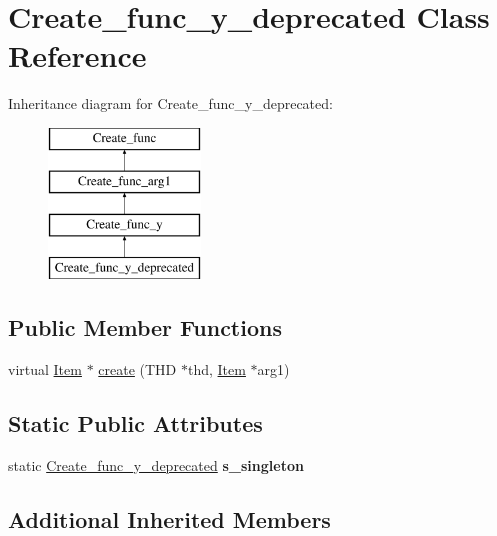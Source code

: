 \hypertarget{classCreate__func__y__deprecated}{}\section{Create\+\_\+func\+\_\+y\+\_\+deprecated Class Reference}
\label{classCreate__func__y__deprecated}
Inheritance diagram for Create\+\_\+func\+\_\+y\+\_\+deprecated\+:\begin{figure}[H]
\begin{center}
\leavevmode
\includegraphics[height=4.000000cm]{classCreate__func__y__deprecated}
\end{center}
\end{figure}
\subsection*{Public Member Functions}
\begin{DoxyCompactItemize}
\item 
virtual \mbox{\hyperlink{classItem}{Item}} $\ast$ \mbox{\hyperlink{classCreate__func__y__deprecated_a0321bced52d2aeb8efaec4648937fb43}{create}} (T\+HD $\ast$thd, \mbox{\hyperlink{classItem}{Item}} $\ast$arg1)
\end{DoxyCompactItemize}
\subsection*{Static Public Attributes}
\begin{DoxyCompactItemize}
\item 
\mbox{\label{classCreate__func__y__deprecated_a556e83d67d873dff41e9e42b386257ca}} 
static \mbox{\hyperlink{classCreate__func__y__deprecated}{Create\+\_\+func\+\_\+y\+\_\+deprecated}} {\bfseries s\+\_\+singleton}
\end{DoxyCompactItemize}
\subsection*{Additional Inherited Members}


